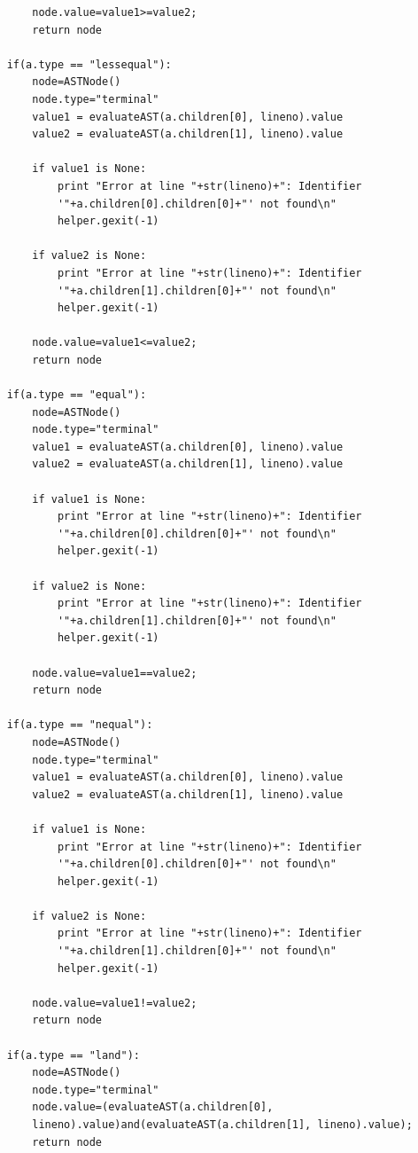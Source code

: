 \documentclass[a4paper]{article}
\begin{document}
\begin{verbatim}
        node.value=value1>=value2;
        return node

    if(a.type == "lessequal"):
        node=ASTNode()
        node.type="terminal"
        value1 = evaluateAST(a.children[0], lineno).value
        value2 = evaluateAST(a.children[1], lineno).value

        if value1 is None:
            print "Error at line "+str(lineno)+": Identifier 
            '"+a.children[0].children[0]+"' not found\n"
            helper.gexit(-1)
            
        if value2 is None:
            print "Error at line "+str(lineno)+": Identifier 
            '"+a.children[1].children[0]+"' not found\n"
            helper.gexit(-1)

        node.value=value1<=value2;
        return node

    if(a.type == "equal"):
        node=ASTNode()
        node.type="terminal"
        value1 = evaluateAST(a.children[0], lineno).value
        value2 = evaluateAST(a.children[1], lineno).value

        if value1 is None:
            print "Error at line "+str(lineno)+": Identifier 
            '"+a.children[0].children[0]+"' not found\n"
            helper.gexit(-1)
            
        if value2 is None:
            print "Error at line "+str(lineno)+": Identifier 
            '"+a.children[1].children[0]+"' not found\n"
            helper.gexit(-1)

        node.value=value1==value2;
        return node

    if(a.type == "nequal"):
        node=ASTNode()
        node.type="terminal"
        value1 = evaluateAST(a.children[0], lineno).value
        value2 = evaluateAST(a.children[1], lineno).value

        if value1 is None:
            print "Error at line "+str(lineno)+": Identifier 
            '"+a.children[0].children[0]+"' not found\n"
            helper.gexit(-1)
            
        if value2 is None:
            print "Error at line "+str(lineno)+": Identifier 
            '"+a.children[1].children[0]+"' not found\n"
            helper.gexit(-1)

        node.value=value1!=value2;
        return node

    if(a.type == "land"):
        node=ASTNode()
        node.type="terminal"
        node.value=(evaluateAST(a.children[0], 
        lineno).value)and(evaluateAST(a.children[1], lineno).value);
        return node


\end{verbatim}
\end{document}
